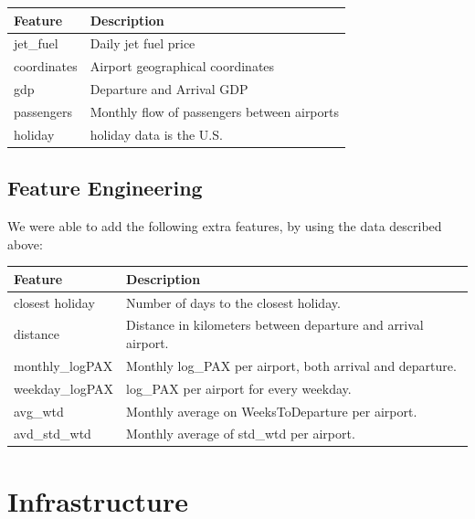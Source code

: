 \documentclass[a4paper,12pt,twoside]{article}
\begin{document}
\begin{table}[H]
	\centering
	\begin{tabular}{|l|l|}
	\hline
	\textbf{Feature} & \textbf{Description}                        \\ \hline
	jet\_fuel        & Daily jet fuel price                        \\ \hline
	coordinates      & Airport geographical coordinates            \\ \hline
	gdp              & Departure and Arrival GDP                   \\ \hline
	passengers       & Monthly flow of passengers between airports \\ \hline
	holiday          & holiday data is the U.S.                    \\ \hline
	\end{tabular}
	\label{table:additional}
\end{table}

\subsection{Feature Engineering}



We were able to add the following extra features, by using the data described above:

\begin{table}[H]
	\centering
	\begin{tabular}{|l|l|}
	\hline
	\textbf{Feature} & \textbf{Description}                        \\ \hline
	closest holiday  & Number of days to the closest holiday.\\ \hline
	distance      	 & Distance in kilometers between departure and arrival airport.\\ \hline
	monthly\_logPAX   & Monthly log\_PAX per airport, both arrival and departure.  \\ \hline
	weekday\_logPAX   & log\_PAX per airport for every weekday.                    \\ \hline
	avg\_wtd          & Monthly average on WeeksToDeparture per airport.           \\ \hline
	avd\_std\_wtd      & Monthly average of std\_wtd per airport.                   \\ \hline
	\end{tabular}
	\label{table:feature_engineering}
\end{table}

\section{Infrastructure}
\end{document}
